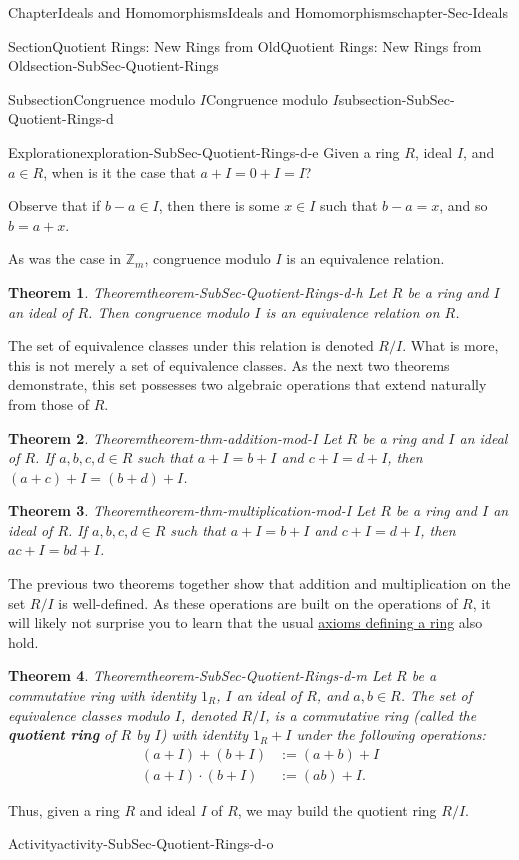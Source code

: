 \documentclass[oneside,10pt,]{book}
\newcommand{\terminology}[1]{\textbf{#1}}
\numberwithin{equation}{section}
\def\Z{{\mathbb Z}}
\newtheorem{theorem}{Theorem}[section]
\begin{document}
\begin{chapterptx}{Chapter}{Ideals and Homomorphisms}{}{Ideals and Homomorphisms}{}{}{chapter-Sec-Ideals}
\begin{sectionptx}{Section}{Quotient Rings: New Rings from Old}{}{Quotient Rings: New Rings from Old}{}{}{section-SubSec-Quotient-Rings}
\begin{subsectionptx}{Subsection}{Congruence modulo \(I\)}{}{Congruence modulo \(I\)}{}{}{subsection-SubSec-Quotient-Rings-d}
\begin{exploration}{Exploration}{}{exploration-SubSec-Quotient-Rings-d-e}
Given a ring \(R\), ideal \(I\), and \(a\in R\), when is it the case that \(a + I = 0 + I = I\)?%
\end{exploration}%
Observe that if \(b-a \in I\), then there is some \(x\in I\) such that \(b-a = x\), and so \(b = a+x\).%
\par
As was the case in \(\Z_m\), congruence modulo \(I\) is an equivalence relation.%
\begin{theorem}{Theorem}{}{}{theorem-SubSec-Quotient-Rings-d-h}%
Let \(R\) be a ring and \(I\) an ideal of \(R\). Then congruence modulo \(I\) is an equivalence relation on \(R\).%
\end{theorem}
The set of equivalence classes under this relation is denoted \(R/I\). What is more, this is not merely a set of equivalence classes. As the next two theorems demonstrate, this set possesses two algebraic operations that extend naturally from those of \(R\).%
\begin{theorem}{Theorem}{}{}{theorem-thm-addition-mod-I}%
Let \(R\) be a ring and \(I\) an ideal of \(R\). If \(a,b,c,d\in R\) such that \(a+I = b+I\) and \(c+I = d+I\), then \((a+c) + I = (b+d) + I\).%
\end{theorem}
\begin{theorem}{Theorem}{}{}{theorem-thm-multiplication-mod-I}%
Let \(R\) be a ring and \(I\) an ideal of \(R\). If \(a,b,c,d\in R\) such that \(a+I = b+I\) and \(c+I = d+I\), then \(ac + I = bd + I\).%
\end{theorem}
The previous two theorems together show that addition and multiplication on the set \(R/I\) is well-defined. As these operations are built on the operations of \(R\), it will likely not surprise you to learn that the usual \hyperref[definition-def_ring]{axioms defining a ring} also hold.%
\begin{theorem}{Theorem}{}{}{theorem-SubSec-Quotient-Rings-d-m}%
%
Let \(R\) be a commutative ring with identity \(1_R\), \(I\) an ideal of \(R\), and \(a,b\in R\). The set of equivalence classes modulo \(I\), denoted \(R/I\), is a commutative ring (called the \terminology{quotient ring} of \(R\) by \(I\)) with identity \(1_R + I\) under the following operations: %
%
\begin{align*}
(a+I) + (b+I) & := (a+b) + I\\
(a+I) \cdot (b+I) & := (ab) + I.
\end{align*}
\end{theorem}
Thus, given a ring \(R\) and ideal \(I\) of \(R\), we may build the quotient ring \(R/I\).%
\begin{activity}{Activity}{}{activity-SubSec-Quotient-Rings-d-o}%

\end{activity}
\end{subsectionptx}
\end{sectionptx}
\end{chapterptx}
\end{document}
